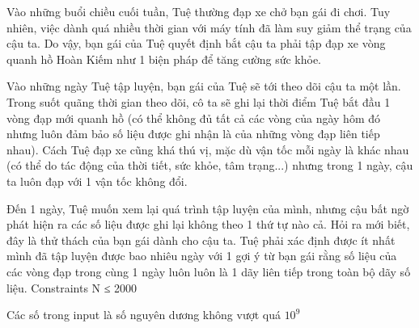 Vào những buổi chiều cuối tuần, Tuệ thường đạp xe chở bạn gái đi chơi. Tuy nhiên, việc dành quá nhiều thời gian với máy tính đã làm suy giảm thể trạng của cậu ta. Do vậy, bạn gái của Tuệ quyết định bắt cậu ta phải tập đạp xe vòng quanh hồ Hoàn Kiếm như 1 biện pháp để tăng cường sức khỏe.   





   Vào những ngày Tuệ tập luyện, bạn gái của Tuệ sẽ tới theo dõi cậu ta một lần. Trong suốt quãng thời gian theo dõi, cô ta sẽ ghi lại thời điểm Tuệ bắt đầu 1 vòng đạp mới quanh hồ (có thể không đủ tất cả các vòng của ngày hôm đó nhưng luôn đảm bảo số liệu được ghi nhận là của những vòng đạp liên tiếp nhau). Cách Tuệ đạp xe cũng khá thú vị, mặc dù vận tốc mỗi ngày là khác nhau (có thể do tác động của thời tiết, sức khỏe, tâm trạng...) nhưng trong 1 ngày, cậu ta luôn đạp với 1 vận tốc không đổi.   





   Đến 1 ngày, Tuệ muốn xem lại quá trình tập luyện của mình, nhưng cậu bất ngờ phát hiện ra các số liệu được ghi lại không theo 1 thứ tự nào cả. Hỏi ra mới biết, đây là thử thách của bạn gái dành cho cậu ta. Tuệ phải xác định được ít nhất mình đã tập luyện được bao nhiêu ngày với 1 gợi ý từ bạn gái rằng số liệu của các vòng đạp trong cùng 1 ngày luôn luôn là 1 dãy liên tiếp trong toàn bộ dãy số liệu.
Constraints
N ≤ 2000   


   Các số trong input là số nguyên dương không vượt quá $10^{9}$